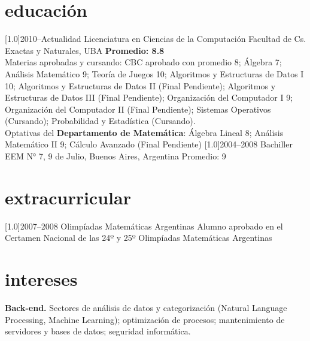 \documentclass[espanol]{cv-style}     %
\begin{document}
	\section{educación}
	\vspace{-0.2cm}
	\begin{entrylist}
		\entry
		{\scalebox{.8}[1.0]{2010--Actualidad}}
		{Licenciatura en Ciencias de la Computación}
		{Facultad de Cs. Exactas y Naturales, UBA}
		{\textbf{Promedio: 8.8}\\
			\small{Materias aprobadas y cursando: CBC aprobado con promedio 8; Álgebra 7; Análisis Matemático 9; Teoría de Juegos 10; Algoritmos y Estructuras de Datos I 10; Algoritmos y Estructuras de Datos II (Final Pendiente); Algoritmos y Estructuras de Datos III (Final Pendiente); Organización del Computador I 9; Organización del Computador II (Final Pendiente); Sistemas Operativos (Cursando); Probabilidad y Estadística (Cursando).\\
				Optativas del \textbf{Departamento de Matemática}: Álgebra Lineal 8; Análisis Matemático II 9; Cálculo Avanzado (Final Pendiente)}}
		\entry
		{\scalebox{.8}[1.0]{2004--2008}}
		{Bachiller }
		{EEM N° 7, 9 de Julio, Buenos Aires, Argentina}
		{Promedio: 9}
	\end{entrylist}
	\section{extracurricular}
	\vspace{-0.2cm}
	\begin{entrylist}
		\entry
		{\scalebox{.8}[1.0]{2007--2008}}
		{Olimpíadas Matemáticas Argentinas}
		{}
		{Alumno aprobado en el Certamen Nacional de las 24º y 25º Olimpíadas Matemáticas Argentinas}
	\end{entrylist}
	\vspace{-0.2cm}
	\section{intereses}
	\vspace{-0.2cm}
	\textbf{Back-end.} Sectores de análisis de datos y categorización (Natural Language Processing, Machine Learning); optimización de procesos; mantenimiento de servidores y bases de datos; seguridad informática.
\end{document}
